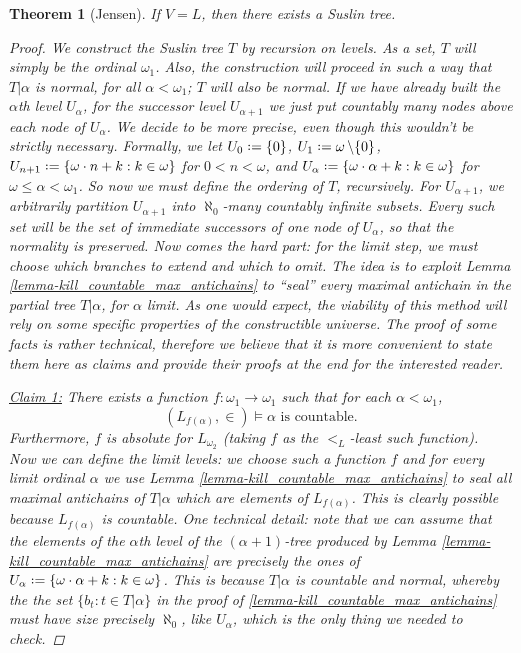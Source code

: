 \documentclass[11pt,a4paper]{report}
\newtheorem{theorem}{Theorem}[chapter] %
\theoremstyle{definition}
\theoremstyle{num.custom-title}
\theoremstyle{custom-title}
\newenvironment{claim}[1]{\par\noindent\underline{Claim#1:}\space}{} %
\DeclareMathOperator{\sm}{\setminus}
\newcommand*{\defeq}{\mathrel{\rlap{%
                     \raisebox{0.3ex}{$\cdot$}}%
                     \raisebox{-0.3ex}{$\cdot$}}%
                     =}
\begin{document}
\begin{theorem}[Jensen]\label{thm-suslin_tree_in_L}
If $V=L$, then there exists a Suslin tree.
\begin{proof}
We construct the Suslin tree $T$ by recursion on levels. As a set, $T$ will simply be the ordinal $\omega_1$. Also, the construction will proceed in such a way that $T|\alpha$ is normal, for all $\alpha < \omega_1$; $T$ will also be normal. If we have already built the $\alpha$th level $U_\alpha$, for the successor level $U_{\alpha+1}$ we just put countably many nodes above each node of $U_\alpha$. We decide to be more precise, even though this wouldn't be strictly necessary. Formally, we let $U_0 \defeq \{0\}$, $U_1 \defeq \omega \sm \{0\}$, $U_{n+1} \defeq \{ \omega \cdot n + k : k \in \omega \}$ for $0<n<\omega$, and $U_\alpha \defeq \{ \omega \cdot \alpha + k : k \in \omega \}$ for $\omega \leq \alpha < \omega_1$. So now we must define the ordering of $T$, recursively. For $U_{\alpha+1}$, we arbitrarily partition $U_{\alpha+1}$ into $\aleph_0$-many countably infinite subsets. Every such set will be the set of immediate successors of one node of $U_\alpha$, so that the normality is preserved. Now comes the hard part: for the limit step, we must choose which branches to extend and which to omit. The idea is to exploit Lemma \ref{lemma-kill_countable_max_antichains} to ``seal'' every maximal antichain in the partial tree $T|\alpha$, for $\alpha$ limit. As one would expect, the viability of this method will rely on some specific properties of the constructible universe. The proof of some facts is rather technical, therefore we believe that it is more convenient to state them here as claims and provide their proofs at the end for the interested reader.\\
\begin{claim}{ 1}
There exists a function $f \colon \omega_1 \to \omega_1$ such that for each $\alpha < \omega_1$,
\[
(L_{f(\alpha)}, \in) \models \alpha \text{ is countable}.
\]
Furthermore, $f$ is absolute for $L_{\omega_2}$ (taking $f$ as the $<_L$-least such function).
\end{claim}\\

Now we can define the limit levels: we choose such a function $f$ and for every limit ordinal $\alpha$ we use Lemma \ref{lemma-kill_countable_max_antichains} to seal all maximal antichains of $T|\alpha$ which are elements of $L_{f(\alpha)}$. This is clearly possible because $L_{f(\alpha)}$ is countable. One technical detail: note that we can assume that the elements of the $\alpha$th level of the $(\alpha+1)$-tree produced by Lemma \ref{lemma-kill_countable_max_antichains} are precisely the ones of $U_\alpha \defeq \{ \omega \cdot \alpha + k : k \in \omega \}$. This is because $T|\alpha$ is countable and normal, whereby the the set $\{b_t : t \in T|\alpha\}$ in the proof of \ref{lemma-kill_countable_max_antichains} must have size precisely $\aleph_0$, like $U_\alpha$, which is the only thing we needed to check.


\end{proof}
\end{theorem}
\end{document}
